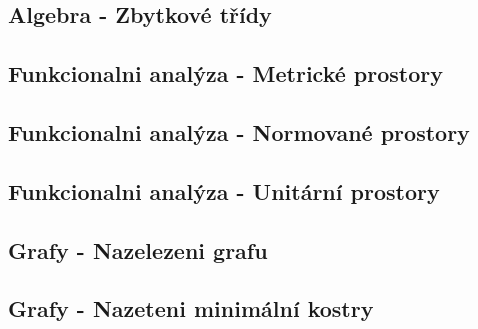 \documentclass[12pt,a4paper,notitlepage,final]{article}
\begin{document}
\subsection{Algebra - Zbytkové třídy}
\setcounter{section}{3}
\setcounter{subsection}{4}



\setcounter{section}{6}
\setcounter{subsection}{8}
\subsection{Funkcionalni analýza - Metrické prostory}
\setcounter{section}{4}
\setcounter{subsection}{1}

\setcounter{section}{6}
\setcounter{subsection}{9}
\subsection{Funkcionalni analýza - Normované prostory}
\setcounter{section}{4}
\setcounter{subsection}{2}

\setcounter{section}{6}
\setcounter{subsection}{10}
\subsection{Funkcionalni analýza - Unitární prostory}
\setcounter{section}{4}
\setcounter{subsection}{3}


\setcounter{section}{6}
\setcounter{subsection}{11}
\subsection{Grafy - Nazelezeni grafu}
\setcounter{section}{5}
\setcounter{subsection}{1}

\setcounter{section}{6}
\setcounter{subsection}{12}
\subsection{Grafy - Nazeteni minimální kostry}
\setcounter{section}{5}
\setcounter{subsection}{2}

\end{document}
